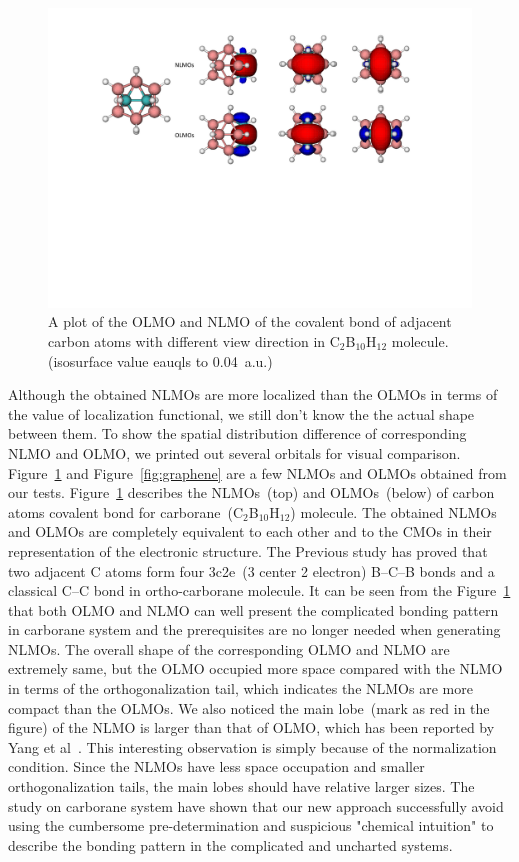 \documentclass[aps,prl,reprint,amsmath,amssymb]{revtex4-1}
\begin{document}
\begin{figure}[hbpt]
\centering
\includegraphics[width=\textwidth]{figure_3.pdf}
\caption{A plot of the OLMO and NLMO of the covalent bond of adjacent carbon atoms with different view direction  in C$_2$B$_{10}$H$_{12}$ molecule. (isosurface value eauqls to 0.04~a.u.)}
\label{fig:boro}
\end{figure}

Although the obtained NLMOs are more localized than the OLMOs in terms of the value of localization functional, we still don't know the the actual shape between them.
To show the spatial distribution difference of corresponding NLMO and OLMO, we printed out several orbitals for visual comparison.
Figure~\ref{fig:boro} and Figure~\ref{fig:graphene} are a few NLMOs and OLMOs obtained from our tests.
Figure~\ref{fig:boro} describes the NLMOs~(top) and OLMOs~(below) of carbon atoms covalent bond for carborane~(C$_2$B$_{10}$H$_{12}$) molecule.
The obtained NLMOs and OLMOs  are completely equivalent to each other and to the CMOs in their representation of the electronic structure.
The Previous study has proved that two adjacent C atoms form four 3c2e~(3 center 2 electron) B–C–B bonds and a classical C–C bond in ortho-carborane molecule\cite{melichar2018systematic}.
It can be seen from the Figure~\ref{fig:boro} that both OLMO and NLMO can well present the complicated bonding pattern in carborane system and the  prerequisites are no longer needed when generating NLMOs.
The overall shape of the corresponding OLMO and NLMO are extremely same, but the OLMO occupied more space compared with the NLMO in terms of the orthogonalization tail, which indicates the NLMOs are more compact than the OLMOs.
We also noticed the main lobe~(mark as red in the figure) of the NLMO is larger than that of OLMO, which has been reported by Yang et al~\cite{liu2000nonorthogonal}.
This interesting observation is simply because of the normalization condition.
Since the NLMOs have less space occupation and smaller orthogonalization tails, the main lobes should have relative larger sizes.
The study on carborane system have shown that our new approach successfully avoid using the cumbersome pre-determination and suspicious "chemical intuition" to describe the bonding pattern in the complicated and uncharted systems.
\end{document}
